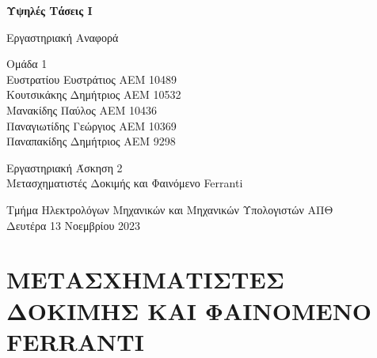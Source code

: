 \documentclass[titlepage, 12pt, a4paper]{article}
\begin{document}
\begin{titlepage}
\begin{center}
    \vspace*{1cm}
            
    \Huge
    \textbf{Υψηλές Τάσεις Ι}
            
    \vspace{0.5cm}
    \LARGE
    Εργαστηριακή Αναφορά
            
    \vspace{2.5cm}
    \LARGE     
    Ομάδα 1\\
    \Large
    \vspace{0.2cm}
    Ευστρατίου Ευστράτιος ΑΕΜ 10489\\
    \vspace{0.2cm}
    Κουτσικάκης Δημήτριος ΑΕΜ 10532\\
    \vspace{0.2cm}
    Μανακίδης Παύλος ΑΕΜ 10436\\
    \vspace{0.2cm}
    Παναγιωτίδης Γεώργιος ΑΕΜ 10369\\
    \vspace{0.2cm}
    Παναπακίδης Δημήτριος ΑΕΜ 9298
            
    \vfill
    \Large        
    Εργαστηριακή Άσκηση 2\\
    Μετασχηματιστές Δοκιμής και Φαινόμενο Ferranti
            
    \vspace{0.8cm}
            
    \large
    Τμήμα Ηλεκτρολόγων Μηχανικών και Μηχανικών Υπολογιστών ΑΠΘ\\
    Δευτέρα 13 Νοεμβρίου 2023
            

\end{center}
\date{Χειμερινό Εξάμηνο 2023-2024}
\end{titlepage}

\justifying

\vspace{1cm}
\section*{ΜΕΤΑΣΧΗΜΑΤΙΣΤΕΣ ΔΟΚΙΜΗΣ ΚΑΙ ΦΑΙΝΟΜΕΝΟ FERRANTI}
\vspace{0.3cm}
\end{document}
